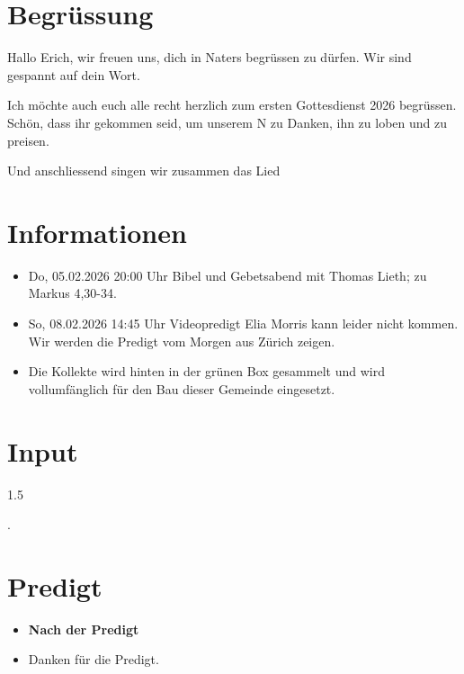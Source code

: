 \documentclass[fontsize=14pt]{mybib}
\newcommand{\Name}{Erich}
\begin{document}
\section{Begrüssung}
Hallo \Name{}, wir freuen uns, dich in Naters begrüssen zu dürfen. Wir sind gespannt auf dein Wort.

Ich möchte auch euch alle recht herzlich zum ersten Gottesdienst 2026 begrüssen. Schön, dass ihr gekommen seid, um unserem \herr N zu Danken, ihn zu loben und zu preisen.

\beten{} Und anschliessend singen wir zusammen das Lied



\section{Informationen}
\begin{itemize}
    \item {} Do, 05.02.2026 20:00 Uhr Bibel und Gebetsabend mit Thomas Lieth; zu Markus 4,30-34.
    \item {} So, 08.02.2026 14:45 Uhr Videopredigt Elia Morris kann leider nicht kommen. Wir werden die Predigt vom Morgen aus Zürich zeigen.
    \item {} Die Kollekte wird hinten in der grünen Box gesammelt und wird vollumfänglich für den Bau dieser Gemeinde eingesetzt.   
\end{itemize}

\section{Input}
\begin{spacing}{1.5}
    


    .

\end{spacing}

\section{Predigt}
\begin{itemize}
\item[] \textbf{Nach der Predigt}
\item[] Danken für die Predigt.
\end{itemize}
\end{document}
